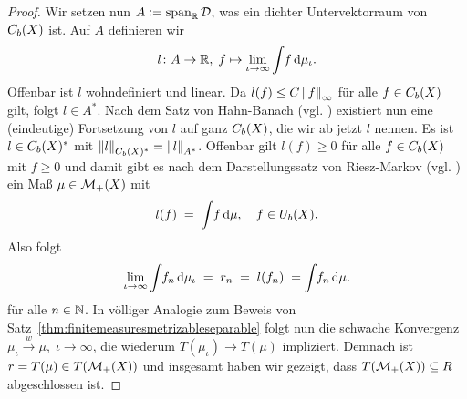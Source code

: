 \documentclass[../main/main.tex]{subfiles}
\begin{document}
\begin{proof}
		Wir setzen nun $A \vcentcolon = \mathrm{span}_{\mathbb{R}} \, \mathcal{D}$, was ein dichter Untervektorraum von $C_b(X)$ ist. Auf $A$ definieren wir
		\[ l \colon A \to \mathbb{R}, \; f \mapsto \lim_{\iota \to \infty} \int_{} \, f \, \mathrm{d}\mu_\iota  \text{.} \]
		Offenbar ist $l$ wohndefiniert und linear. Da $l(f) \leq C \left\lVert f\right\rVert_\infty$ für alle $f \in C_b(X)$ gilt, folgt $l \in A^\ast$. Nach dem Satz von Hahn-Banach (vgl. \cite[Folgerung 5.5.2]{Simon.2015})
		existiert nun eine (eindeutige) Fortsetzung von $l$ auf ganz $C_b(X)$, die wir ab jetzt $l$ nennen. Es ist $l \in C_b(X)^\ast$ 
		mit $\left\lVert l\right\rVert_{C_b(X)^\ast} = \left\lVert l\right\rVert_{A^\ast}$. Offenbar gilt $l(f) \geq 0$ für alle $f \in C_b(X)$ mit $f \geq 0$ und damit gibt es 
		nach dem Darstellungssatz von Riesz-Markov (vgl. \cite[Satz 4.8.8]{Simon.2015}) ein Maß $\mu \in \mathcal{M}_{+}(X)$ mit 
		\[ l(f) \; = \; \int_{} \, f \, \mathrm{d}\mu, \quad f \in U_b(X) \text{.} \]
		Also folgt
		\[ \lim_{\iota \to \infty} \int_{} \, f_n \, \mathrm{d}\mu_\iota \; = \; r_n \; = \; l(f_n) \; = \int_{} \, f_n \, \mathrm{d}\mu \text{.} \]
		für alle $n \in \mathbb{N}$. In völliger Analogie zum Beweis von Satz~\ref{thm:finitemeasuresmetrizableseparable} folgt nun die schwache Konvergenz $\mu_\iota \xrightarrow{w} \mu, \; \iota \to \infty$,
		die wiederum $T(\mu_\iota) \to T(\mu)$ impliziert. Demnach ist $r = T(\mu) \in T(\mathcal{M}_{+}(X))$ und insgesamt haben wir gezeigt, dass $T(\mathcal{M}_{+}(X)) \subseteq R$ abgeschlossen ist.
	\end{proof}
\end{document}
